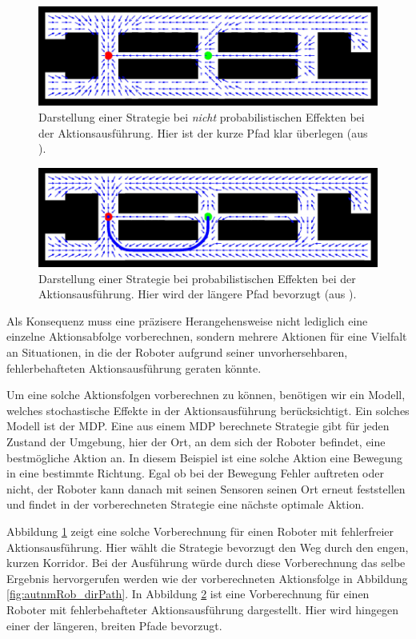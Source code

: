 \documentclass[a4paper]{IEEEtran}
\begin{document}
\begin{figure}[ht]
	\centering
	\includegraphics[scale=0.72]{images/autnmRobot_detActionMDP.png}
	\caption{Darstellung einer Strategie bei \emph{nicht} probabilistischen Effekten bei der Aktionsausführung. Hier ist der kurze Pfad klar überlegen (aus \cite{thrun2005probabilistic}).}
	\label{autnmRobot_detA}
\end{figure}
\begin{figure}
	\includegraphics[scale=0.72]{images/autnmRobot_ndetActionMDP.png}
	\caption{Darstellung einer Strategie bei probabilistischen Effekten bei der Aktionsausführung. Hier wird der längere Pfad bevorzugt (aus \cite{thrun2005probabilistic}).}
	\label{autnmRobot_ndetA}
\end{figure}

Als Konsequenz muss eine präzisere Herangehensweise nicht lediglich eine einzelne Aktionsabfolge vorberechnen, sondern mehrere Aktionen für eine Vielfalt an Situationen, in die der Roboter aufgrund seiner unvorhersehbaren, fehlerbehafteten Aktionsausführung geraten könnte.

Um eine solche Aktionsfolgen vorberechnen zu können, benötigen wir ein Modell, welches stochastische Effekte in der Aktionsausführung berücksichtigt. Ein solches Modell ist der MDP. Eine aus einem MDP berechnete Strategie gibt für jeden Zustand der Umgebung, hier der Ort, an dem sich der Roboter befindet, eine bestmögliche Aktion an. In diesem Beispiel ist eine solche Aktion eine Bewegung in eine bestimmte Richtung. Egal ob bei der Bewegung Fehler auftreten oder nicht, der Roboter kann danach mit seinen Sensoren seinen Ort erneut feststellen und findet in der vorberechneten Strategie eine nächste optimale Aktion.

Abbildung \ref{autnmRobot_detA} zeigt eine solche Vorberechnung für einen Roboter mit fehlerfreier Aktionsausführung. Hier wählt die Strategie bevorzugt den Weg durch den engen, kurzen Korridor. Bei der Ausführung würde durch diese Vorberechnung das selbe Ergebnis hervorgerufen werden wie der vorberechneten Aktionsfolge in Abbildung \ref{fig:autnmRob_dirPath}. In Abbildung \ref{autnmRobot_ndetA} ist eine Vorberechnung für einen Roboter mit fehlerbehafteter Aktionsausführung dargestellt. Hier wird hingegen einer der längeren, breiten Pfade bevorzugt.
\end{document}
